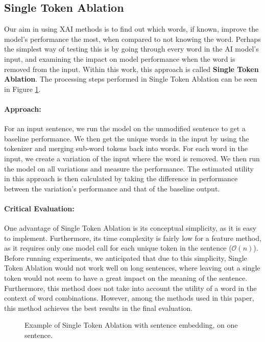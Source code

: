 \subsection{Single Token Ablation}
Our aim in using XAI methods is to find out which words, if known, improve the model's performance the most, when compared to not knowing the word.
Perhaps the simplest way of testing this is by going through every word in the AI model's input, and examining the impact on model performance when the word is removed from the input.
Within this work, this approach is called \textbf{Single Token Ablation}.
The processing steps performed in Single Token Ablation can be seen in Figure \ref{fig:single-token-ablation-sentemb}.

\paragraph{Approach:}
For an input sentence, we run the model on the unmodified sentence to get a baseline performance.
We then get the unique words in the input by using the tokenizer and merging sub-word tokens back into words.
For each word in the input, we create a variation of the input where the word is removed.
We then run the model on all variations and measure the performance.
The estimated utility in this approach is then calculated by taking the difference in performance between the variation's performance and that of the baseline output.

\paragraph{Critical Evaluation:}
One advantage of Single Token Ablation is its conceptual simplicity, as it is easy to implement.
Furthermore, its time complexity is fairly low for a feature method, as it requires only one model call for each unique token in the sentence ($\mathcal{O}(n)$).
Before running experiments, we anticipated that due to this simplicity, Single Token Ablation would not work well on long sentences, where leaving out a single token would not seem to have a great impact on the meaning of the sentence.
Furthermore, this method does not take into account the utility of a word in the context of word combinations.
However, among the methods used in this paper, this method achieves the best results in the final evaluation.

\begin{figure}[H]
	
	\caption{Example of Single Token Ablation with sentence embedding, on one sentence.}
	\label{fig:single-token-ablation-sentemb}
\end{figure}

